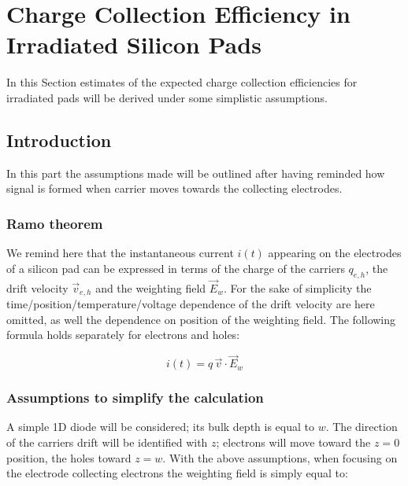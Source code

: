 


\chapter{Charge Collection Efficiency in Irradiated Silicon Pads}
\label{sec:CCEirr}

In this Section estimates of the expected charge collection efficiencies 
for irradiated pads will be derived under some simplistic assumptions.

\section{Introduction}
In this part the assumptions made will be outlined after having reminded how signal is formed when 
carrier moves towards the collecting electrodes.
\subsection{Ramo theorem}
\label{sec:CCEramo}
We remind here that the instantaneous current $i(t)$ appearing on the electrodes of a silicon pad can be expressed 
in terms of the charge of the carriers $q_{e,h}$, the drift velocity $\vec{v}_{e,h}$  and the 
weighting field $\vec{E}_w$. For the sake of simplicity the time/position/temperature/voltage 
dependence of the drift velocity are here omitted, as well the dependence on position of the 
weighting field.
The following formula holds separately for electrons and holes:

\begin{equation}
i(t) = q\,\vec{v}\cdot\vec{E}_w
\end{equation} 

\subsection{Assumptions to simplify the calculation}
\label{sec:assumptions}
A simple 1D diode will be considered; its bulk depth is equal to $w$. The direction of the carriers 
drift will be identified with $z$; electrons will move toward the $z=0$ position, the holes toward $z=w$.
With the above assumptions, when focusing on the electrode collecting electrons 
the weighting field is simply equal to:

